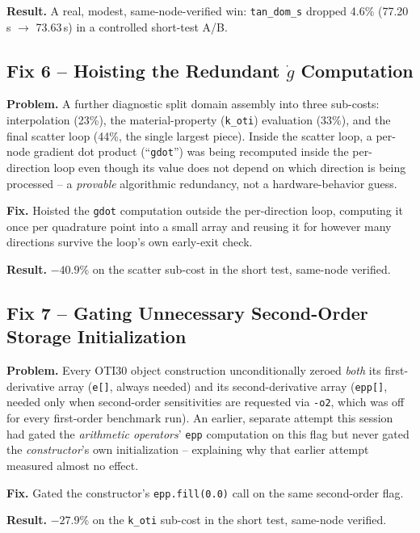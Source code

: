 \documentclass[11pt]{article}
\begin{document}
\textbf{Result.} A real, modest, same-node-verified win: \texttt{tan\_dom\_s}
dropped 4.6\% (77.20\,s $\to$ 73.63\,s) in a controlled short-test A/B.

\subsection{Fix 6 -- Hoisting the Redundant \texorpdfstring{$\dot g$}{gdot} Computation}\label{sec:fix6}
\textbf{Problem.} A further diagnostic split domain assembly into three
sub-costs: interpolation (23\%), the material-property (\texttt{k\_oti})
evaluation (33\%), and the final scatter loop (44\%, the single largest
piece). Inside the scatter loop, a per-node gradient dot product
(``\texttt{gdot}'') was being recomputed inside the per-direction loop
even though its value does not depend on which direction is being
processed -- a \emph{provable} algorithmic redundancy, not a
hardware-behavior guess.

\textbf{Fix.} Hoisted the \texttt{gdot} computation outside the
per-direction loop, computing it once per quadrature point into a small
array and reusing it for however many directions survive the loop's own
early-exit check.

\textbf{Result.} $-40.9\%$ on the scatter sub-cost in the short test,
same-node verified.

\subsection{Fix 7 -- Gating Unnecessary Second-Order Storage Initialization}\label{sec:fix7}
\textbf{Problem.} Every OTI30 object construction unconditionally zeroed
\emph{both} its first-derivative array (\texttt{e[]}, always needed) and
its second-derivative array (\texttt{epp[]}, needed only when second-order
sensitivities are requested via \texttt{-o2}, which was off for every
first-order benchmark run). An earlier, separate attempt this session had
gated the \emph{arithmetic operators}' \texttt{epp} computation on this
flag but never gated the \emph{constructor}'s own initialization --
explaining why that earlier attempt measured almost no effect.

\textbf{Fix.} Gated the constructor's \texttt{epp.fill(0.0)} call on the
same second-order flag.

\textbf{Result.} $-27.9\%$ on the \texttt{k\_oti} sub-cost in the short
test, same-node verified.
\end{document}

